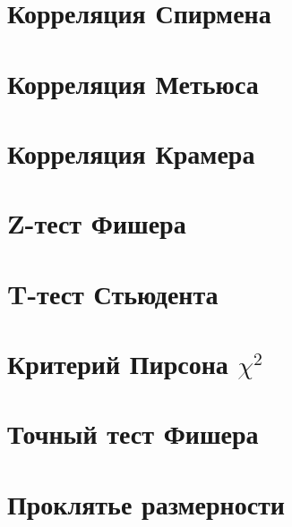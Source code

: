 \section{Корреляция Спирмена}


\section{Корреляция Метьюса}


\section{Корреляция Крамера}


\section{Z-тест Фишера}


\section{T-тест Стьюдента}


\section{Критерий Пирсона $\chi^2$}


\section{Точный тест Фишера}


\section{Проклятье размерности}



